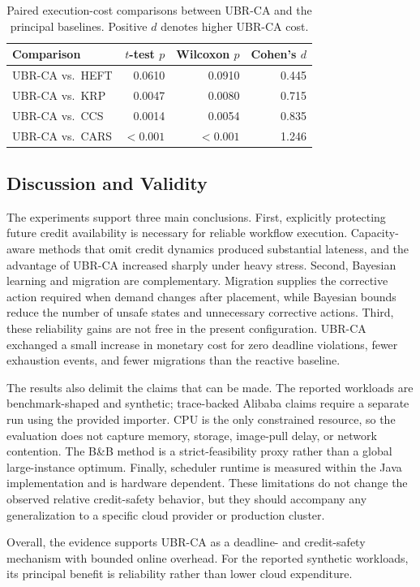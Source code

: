 \begin{table}[t]
\centering
\caption{Paired execution-cost comparisons between UBR-CA and the
principal baselines. Positive $d$ denotes higher UBR-CA cost.}
\label{tab:cost-significance}
\scriptsize
\begin{tabular}{lrrr}
\toprule
Comparison & $t$-test $p$ & Wilcoxon $p$ & Cohen's $d$ \\
\midrule
UBR-CA vs.\ HEFT & 0.0610 & 0.0910 & 0.445 \\
UBR-CA vs.\ KRP  & 0.0047 & 0.0080 & 0.715 \\
UBR-CA vs.\ CCS  & 0.0014 & 0.0054 & 0.835 \\
UBR-CA vs.\ CARS & $<0.001$ & $<0.001$ & 1.246 \\
\bottomrule
\end{tabular}
\end{table}

\subsection{Discussion and Validity}
\label{subsec:discussion}

The experiments support three main conclusions. First, explicitly
protecting future credit availability is necessary for reliable
workflow execution. Capacity-aware methods that omit credit dynamics
produced substantial lateness, and the advantage of UBR-CA increased
sharply under heavy stress. Second, Bayesian learning and migration
are complementary. Migration supplies the corrective action required
when demand changes after placement, while Bayesian bounds reduce the
number of unsafe states and unnecessary corrective actions. Third,
these reliability gains are not free in the present configuration.
UBR-CA exchanged a small increase in monetary cost for zero deadline
violations, fewer exhaustion events, and fewer migrations than the
reactive baseline.

The results also delimit the claims that can be made. The reported
workloads are benchmark-shaped and synthetic; trace-backed Alibaba
claims require a separate run using the provided importer. CPU is the
only constrained resource, so the evaluation does not capture memory,
storage, image-pull delay, or network contention. The B\&B method is a
strict-feasibility proxy rather than a global large-instance optimum.
Finally, scheduler runtime is measured within the Java implementation
and is hardware dependent. These limitations do not change the
observed relative credit-safety behavior, but they should accompany
any generalization to a specific cloud provider or production cluster.

Overall, the evidence supports UBR-CA as a deadline- and credit-safety
mechanism with bounded online overhead. For the reported synthetic
workloads, its principal benefit is reliability rather than lower
cloud expenditure.
